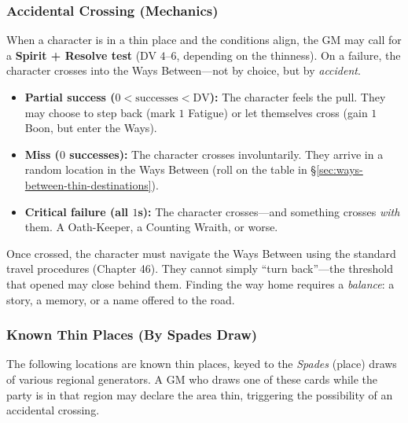 \subsubsection*{Accidental Crossing (Mechanics)}
When a character is in a thin place and the conditions align, the GM may call for a \textbf{Spirit + Resolve test} (DV $4$--$6$, depending on the thinness). On a failure, the character crosses into the Ways Between---not by choice, but by \emph{accident}.

\begin{itemize}
\item \textbf{Partial success ($0 < \text{successes} < \text{DV}$):} The character feels the pull. They may choose to step back (mark $1$ Fatigue) or let themselves cross (gain $1$ Boon, but enter the Ways).
\item \textbf{Miss ($0$ successes):} The character crosses involuntarily. They arrive in a random location in the Ways Between (roll on the table in §\ref{sec:ways-between-thin-destinations}).
\item \textbf{Critical failure (all $1$s):} The character crosses---and something crosses \emph{with} them. A Oath-Keeper, a Counting Wraith, or worse.
\end{itemize}

Once crossed, the character must navigate the Ways Between using the standard travel procedures (Chapter 46). They cannot simply ``turn back''---the threshold that opened may close behind them. Finding the way home requires a \emph{balance}: a story, a memory, or a name offered to the road.

\subsubsection*{Known Thin Places (By Spades Draw)}
The following locations are known thin places, keyed to the \emph{Spades} (place) draws of various regional generators. A GM who draws one of these cards while the party is in that region may declare the area thin, triggering the possibility of an accidental crossing.

